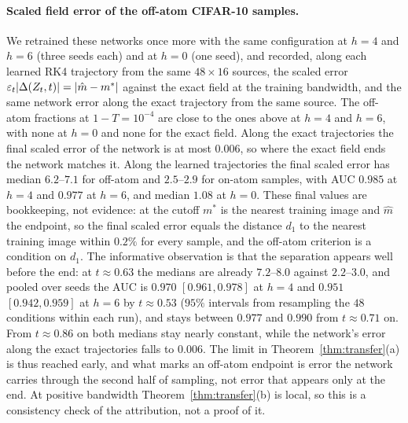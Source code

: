 \documentclass{article} %
\theoremstyle{plain}
\theoremstyle{definition}
\theoremstyle{remark}
\begin{document}
\paragraph{Scaled field error of the off-atom CIFAR-10 samples.} We retrained these networks once
more with the same configuration at $h=4$ and $h=6$ (three seeds each) and at $h=0$ (one seed), and recorded, along
each learned RK4 trajectory from the same $48\times16$ sources, the scaled error
$\varepsilon_t|\Delta(Z_t,t)|=|\hat m-m^*|$ against the exact field at the training bandwidth, and the
same network error along the exact trajectory from the same source. The
off-atom fractions at $1-T=10^{-4}$ are close to the ones above at $h=4$ and $h=6$, with none at
$h=0$ and none for the exact field.
Along the exact trajectories the final scaled error of the network is at most $0.006$, so where the exact field
ends the network matches it. Along the learned trajectories the final scaled error has median
$6.2$--$7.1$ for off-atom and $2.5$--$2.9$ for on-atom samples, with AUC $0.985$ at $h=4$ and
$0.977$ at $h=6$, and median $1.08$ at $h=0$. These final values are bookkeeping, not evidence: at
the cutoff $m^*$ is the nearest training image and $\hat m$ the endpoint, so the final scaled error
equals the distance $d_1$ to the nearest training image within $0.2\%$ for every sample, and the
off-atom criterion is a condition on $d_1$. The informative observation is that the separation
appears well before the end: at $t\approx0.63$ the medians are already $7.2$--$8.0$ against
$2.2$--$3.0$, and pooled over seeds the AUC is $0.970$ $[0.961,0.978]$ at $h=4$ and $0.951$
$[0.942,0.959]$ at $h=6$ by $t\approx0.53$ ($95\%$ intervals from resampling the $48$ conditions
within each run), and stays between $0.977$ and $0.990$ from $t\approx0.71$ on. From $t\approx0.86$ on both
medians stay nearly constant, while the network's error along the exact trajectories falls to
$0.006$. The limit in Theorem~\ref{thm:transfer}(a) is thus reached early, and what marks an
off-atom endpoint is error the network carries through the second half of sampling, not error that
appears only at the end. At positive bandwidth Theorem~\ref{thm:transfer}(b) is local, so
this is a consistency check of the attribution, not a proof of it.
\end{document}
